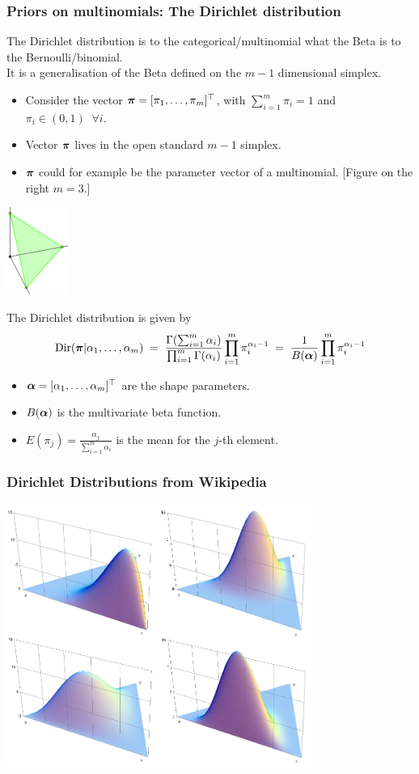 \begin{frame}
\frametitle{Priors on multinomials: The Dirichlet distribution}

The Dirichlet distribution is to the categorical/multinomial what the Beta is to the Bernoulli/binomial.\\ 
It is a generalisation of the Beta defined on the $m-1$ dimensional simplex.

\parbox{0.69\textwidth}{
\begin{itemize}
\item Consider the vector $\boldsymbol{\pi}=[\pi_1,\ldots,\pi_m]^\top$, with $\sum_{i=1}^m \pi_i=1$ 
and $\pi_i\in(0,1)\;\; \forall i$.
\item Vector $\boldsymbol{\pi}$ lives in the open standard $m-1$ simplex.
\item $\boldsymbol{\pi}$ could for example be the parameter vector of a multinomial.
\hfill[Figure on the right $m=3$.]
\end{itemize}
}
\parbox{0.3\textwidth}{
\centerline{\includegraphics[width=0.15\textwidth]{2D-simplex}}
}

The Dirichlet distribution is given by
\[
\mathrm{Dir}(\boldsymbol{\pi}|\alpha_1,\ldots,\alpha_m)\;=\;
\frac{\Gamma(\sum_{i=1}^m\alpha_i)}{\prod_{i=1}^m\Gamma(\alpha_i)}
\prod_{i=1}^m\pi_i^{\alpha_i-1}
\;=\;\frac{1}{B(\boldsymbol{\alpha})}\prod_{i=1}^m\pi_i^{\alpha_i-1}
\]
\begin{itemize}
\item $\boldsymbol{\alpha}=[\alpha_1,\ldots,\alpha_m]^\top$ are the shape parameters.
\item $B(\boldsymbol{\alpha})$ is the multivariate beta function.
\item $E(\pi_j)=\tfrac{\alpha_j}{\sum_{i=1}^m\alpha_i}$ is the mean for the $j$-th element.
\end{itemize}


\end{frame}


\begin{frame}
\frametitle{Dirichlet Distributions from Wikipedia}
\centerline{\includegraphics[width=0.75\textwidth]{Dirichlet_distributions}}
\end{frame}



